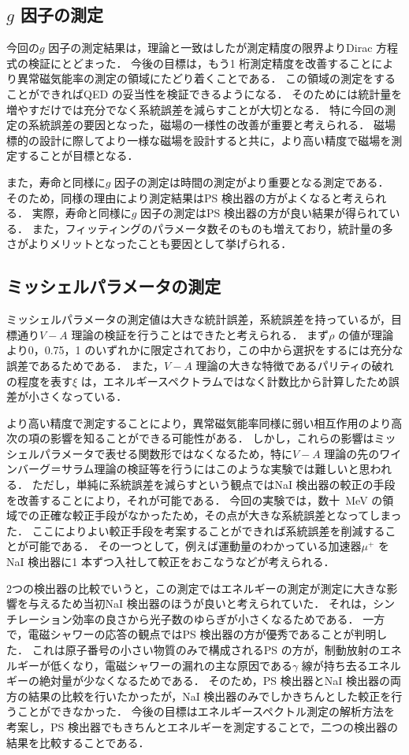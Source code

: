 \subsection{$g$ 因子の測定}
今回の$g$ 因子の測定結果は，理論と一致はしたが測定精度の限界よりDirac 方程式の検証にとどまった．
今後の目標は，もう1 桁測定精度を改善することにより異常磁気能率の測定の領域にたどり着くことである．
この領域の測定をすることができればQED の妥当性を検証できるようになる．
そのためには統計量を増やすだけでは充分でなく系統誤差を減らすことが大切となる．
特に今回の測定の系統誤差の要因となった，磁場の一様性の改善が重要と考えられる．
磁場標的の設計に際してより一様な磁場を設計すると共に，より高い精度で磁場を測定することが目標となる．

また，寿命と同様に$g$ 因子の測定は時間の測定がより重要となる測定である．
そのため，同様の理由により測定結果はPS 検出器の方がよくなると考えられる．
実際，寿命と同様に$g$ 因子の測定はPS 検出器の方が良い結果が得られている．
また，フィッティングのパラメータ数そのものも増えており，統計量の多さがよりメリットとなったことも要因として挙げられる．

\subsection{ミッシェルパラメータの測定}
ミッシェルパラメータの測定値は大きな統計誤差，系統誤差を持っているが，目標通り$V-A$ 理論の検証を行うことはできたと考えられる．
まず$\rho$ の値が理論より0，0.75，1 のいずれかに限定されており，この中から選択をするには充分な誤差であるためである．
また，$V-A$ 理論の大きな特徴であるパリティの破れの程度を表す$\xi$ は，エネルギースペクトラムではなく計数比から計算したため誤差が小さくなっている．

より高い精度で測定することにより，異常磁気能率同様に弱い相互作用のより高次の項の影響を知ることができる可能性がある．
しかし，これらの影響はミッシェルパラメータで表せる関数形ではなくなるため，特に$V-A$ 理論の先のワインバーグ＝サラム理論の検証等を行うにはこのような実験では難しいと思われる．
ただし，単純に系統誤差を減らすという観点ではNaI 検出器の較正の手段を改善することにより，それが可能である．
今回の実験では，数十~MeV の領域での正確な較正手段がなかったため，その点が大きな系統誤差となってしまった．
ここによりよい較正手段を考案することができれば系統誤差を削減することが可能である．
その一つとして，例えば運動量のわかっている加速器$\mu^{+}$ をNaI 検出器に1 本ずつ入社して較正をおこなうなどが考えられる．

2つの検出器の比較でいうと，この測定ではエネルギーの測定が測定に大きな影響を与えるため当初NaI 検出器のほうが良いと考えられていた．
それは，シンチレーション効率の良さから光子数のゆらぎが小さくなるためである．
一方で，電磁シャワーの応答の観点ではPS 検出器の方が優秀であることが判明した．
これは原子番号の小さい物質のみで構成されるPS の方が，制動放射のエネルギーが低くなり，電磁シャワーの漏れの主な原因である$\gamma$ 線が持ち去るエネルギーの絶対量が少なくなるためである．
そのため，PS 検出器とNaI 検出器の両方の結果の比較を行いたかったが，NaI 検出器のみでしかきちんとした較正を行うことができなかった．
今後の目標はエネルギースペクトル測定の解析方法を考案し，PS 検出器でもきちんとエネルギーを測定することで，二つの検出器の結果を比較することである．

